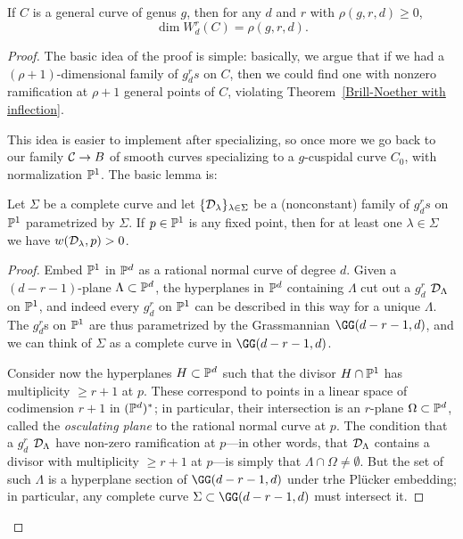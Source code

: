 \begin{theorem}\label{BN with dimension}
If $C$ is a general curve of genus $g$, then for any $d$ and $r$ with $\rho(g,r,d) \geq 0$,
$$
\dim W^r_d(C) = \rho(g,r,d).
$$
\end{theorem}

\begin{proof}
The basic idea of the proof is simple: basically, we argue that if we had a $(\rho+1)$-dimensional family of $g^r_ds$ on $C$, then we could find one with nonzero ramification at $\rho+1$ general points of $C$, violating Theorem~\ref{Brill-Noether with inflection}.

This idea is easier to implement after specializing, so once more we go back to our family $\cC \to B$ of smooth curves specializing to a $g$-cuspidal curve $C_0$, with normalization $\PP^1$. The basic lemma is:

\begin{lemma}\label{forced ramification}
Let $\Sigma$ be a complete curve and let $\{ \cD_\lambda \}_{\lambda \in \Sigma}$ be a (nonconstant) family of $g^r_ds$ on $\PP^1$ parametrized by $\Sigma$. If $p \in \PP^1$ is any fixed point, then for at least one $\lambda \in \Sigma$ we have $w(\cD_\lambda,p)>0$.
\end{lemma}

\begin{proof}
Embed $\PP^1$ in $\PP^d$ as a rational normal curve of degree $d$. Given a $(d-r-1)$-plane $\Lambda \subset \PP^d$, the hyperplanes in $\PP^d$ containing $\Lambda$ cut out a $g^r_d$ $\cD_\Lambda$ on $\PP^1$, and indeed every $g^r_d$ on $\PP^1$ can be described in this way for a unique $\Lambda$. The $g^r_d$s on $\PP^1$ are thus parametrized by the Grassmannian $\GG(d-r-1,d)$, and we can think of $\Sigma$ as a complete curve in $\GG(d-r-1,d)$.

Consider now the hyperplanes $H \subset \PP^d$ such that the divisor $H \cap \PP^1$ has multiplicity $\geq r+1$ at $p$. These correspond to points in a linear space of codimension $r+1$ in $(\PP^d)^*$; in particular, their intersection is an $r$-plane $\Omega \subset \PP^d$, called the \emph{osculating plane} to the rational normal curve at $p$. The condition that a  $g^r_d$ $\cD_\Lambda$ have non-zero ramification at $p$---in other words, that $\cD_\Lambda$ contains a divisor with multiplicity $\geq r+1$ at $p$---is simply that $\Lambda \cap \Omega \neq \emptyset$. But the set of such $\Lambda$ is a hyperplane section of $\GG(d-r-1,d)$ under trhe Pl\"ucker embedding; in particular, any complete curve $\Sigma \subset \GG(d-r-1,d)$ must intersect it.
\end{proof}


\end{proof}
